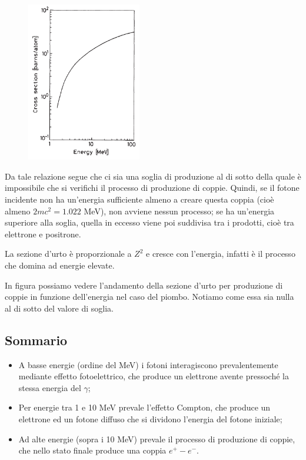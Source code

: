 \begin{minipage}{0.395\textwidth}
    \begin{figure}[H]
        \centering
        \includegraphics[width=5cm]{immagini/sezione_durto_produzione_coppie.png}
    \end{figure}
\end{minipage}
\begin{minipage}{0.6\textwidth}
    Da tale relazione segue che ci sia una soglia di produzione al di sotto della quale è impossibile che si verifichi il processo di produzione di coppie. Quindi, se il fotone incidente non ha un'energia sufficiente almeno a creare questa coppia (cioè almeno $2mc^2=1.022$ MeV), non avviene nessun processo; se ha un'energia superiore alla soglia, quella in eccesso viene poi suddivisa tra i prodotti, cioè tra elettrone e positrone.

    La sezione d'urto è proporzionale a $Z^2$ e cresce con l'energia, infatti è il processo che domina ad energie elevate.
\end{minipage}

\vspace{0.2cm}In figura possiamo vedere l'andamento della sezione d'urto per produzione di coppie in funzione dell'energia nel caso del piombo. Notiamo come essa sia nulla al di sotto del valore di soglia.

\subsection{Sommario}

\begin{itemize}
    \item A basse energie (ordine del MeV) i fotoni interagiscono prevalentemente mediante effetto fotoelettrico, che produce un elettrone avente pressoché la stessa energia del $\gamma$;

    \item Per energie tra 1 e 10 MeV prevale l'effetto Compton, che produce un elettrone ed un fotone diffuso che si dividono l'energia del fotone iniziale;
    \item Ad alte energie (sopra i 10 MeV) prevale il processo di produzione di coppie, che nello stato finale produce una coppia $e^+ - e^-$.
\end{itemize}


